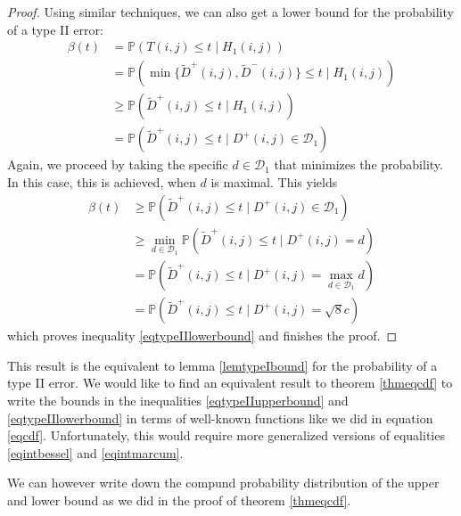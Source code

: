 \documentclass[a4paper,12pt]{article}
\theoremstyle{plain}
\theoremstyle{definition}
\theoremstyle{remark}
\begin{document}
\begin{proof}
	Using similar techniques, we can also get a lower bound for the probability of a type II error:
	\begin{align*}
		\beta(t) &= \mathbb{P}(T(i, j) \leq t \mid H_1(i, j)) \\
		&= \mathbb{P}(\min \{ \tilde{D}^+(i, j), \tilde{D}^-(i, j) \} \leq t \mid H_1(i, j)) \\
		&\geq \mathbb{P}(\tilde{D}^+(i, j) \leq t \mid H_1(i, j)) \\
		&= \mathbb{P}(\tilde{D}^+(i, j) \leq t \mid D^+(i, j) \in \mathcal{D}_1)
	\end{align*}
	Again, we proceed by taking the specific $d \in \mathcal{D}_1$ that minimizes the probability. In this case, this is achieved, when $d$ is maximal. This yields
	\begin{align*}
		\beta(t) &\geq \mathbb{P}(\tilde{D}^+(i, j) \leq t \mid D^+(i, j) \in \mathcal{D}_1) \\
		&\geq \min_{d \in \mathcal{D}_1} \mathbb{P}(\tilde{D}^+(i, j) \leq t \mid D^+(i, j) = d) \\
		&= \mathbb{P}(\tilde{D}^+(i, j) \leq t \mid D^+(i, j) = \max_{d \in \mathcal{D}_1} d) \\
		&= \mathbb{P}(\tilde{D}^+(i, j) \leq t \mid D^+(i, j) = \sqrt{8} c)
	\end{align*}
	which proves inequality \eqref{eqtypeIIlowerbound} and finishes the proof.
\end{proof}

This result is the equivalent to lemma \ref{lemtypeIbound} for the probability of a type II error. We would like to find an equivalent result to theorem \ref{thmeqcdf} to write the bounds in the inequalities \eqref{eqtypeIIupperbound} and \eqref{eqtypeIIlowerbound} in terms of well-known functions like we did in equation \eqref{eqcdf}. Unfortunately, this would require more generalized versions of equalities \eqref{eqintbessel} and \eqref{eqintmarcum}.

We can however write down the compund probability distribution of the upper and lower bound as we did in the proof of theorem \ref{thmeqcdf}.
\end{document}
